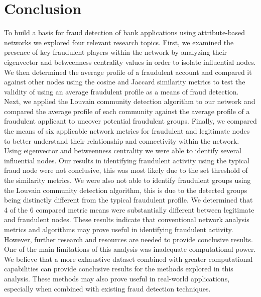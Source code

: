 \documentclass{styles/svproc}
\begin{document}
\section{Conclusion}
To build a basis for fraud detection of bank applications using attribute-based networks we explored four relevant research topics. First, we examined the presence of key fraudulent players within the network by analyzing their eigenvector and betweenness centrality values in order to isolate influential nodes. We then determined the average profile of a fraudulent account and compared it against other nodes using the cosine and Jaccard similarity metrics to test the validity of using an average fraudulent profile as a means of fraud detection. Next, we applied the Louvain community detection algorithm to our network and compared the average profile of each community against the average profile of a fraudulent applicant to uncover potential fraudulent groups. Finally, we compared the means of six applicable network metrics for fraudulent and legitimate nodes to better understand their relationship and connectivity within the network.
Using eigenvector and betweenness centrality we were able to identify several influential nodes. Our results in identifying fraudulent activity using the typical fraud node were not conclusive, this was most likely due to the set threshold of the similarity metrics. We were also not able to identify fraudulent groups using the Louvain community detection algorithm, this is due to the detected groups being distinctly different from the typical fraudulent profile. We determined that 4 of the 6 compared metric means were substantially different between legitimate and fraudulent nodes.
These results indicate that conventional network analysis metrics and algorithms may prove useful in identifying fraudulent activity. However, further research and resources are needed to provide conclusive results. One of the main limitations of this analysis was inadequate computational power. We believe that a more exhaustive dataset combined with greater computational capabilities can provide conclusive results for the methods explored in this analysis. These methods may also prove useful in real-world applications, especially when combined with existing fraud detection techniques.
\end{document}
